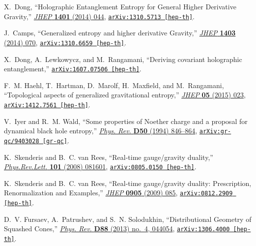 \begin{thebibliography}{100}
X.~Dong, ``{Holographic Entanglement Entropy for General Higher Derivative
  Gravity},'' \href{http://dx.doi.org/10.1007/JHEP01(2014)044}{{\em JHEP} {\bf
  1401} (2014)  044},
\href{http://arxiv.org/abs/1310.5713}{{\tt arXiv:1310.5713 [hep-th]}}.

J.~Camps, ``{Generalized entropy and higher derivative Gravity},''
  \href{http://dx.doi.org/10.1007/JHEP03(2014)070}{{\em JHEP} {\bf 1403} (2014)
   070},
\href{http://arxiv.org/abs/1310.6659}{{\tt arXiv:1310.6659 [hep-th]}}.

X.~Dong, A.~Lewkowycz, and M.~Rangamani, ``{Deriving covariant holographic
  entanglement},''
\href{http://arxiv.org/abs/1607.07506}{{\tt arXiv:1607.07506 [hep-th]}}.

F.~M. Haehl, T.~Hartman, D.~Marolf, H.~Maxfield, and M.~Rangamani,
  ``{Topological aspects of generalized gravitational entropy},''
  \href{http://dx.doi.org/10.1007/JHEP05(2015)023}{{\em JHEP} {\bf 05} (2015)
  023},
\href{http://arxiv.org/abs/1412.7561}{{\tt arXiv:1412.7561 [hep-th]}}.

V.~Iyer and R.~M. Wald, ``{Some properties of Noether charge and a proposal for
  dynamical black hole entropy},''
  \href{http://dx.doi.org/10.1103/PhysRevD.50.846}{{\em Phys. Rev.} {\bf D50}
  (1994)  846--864},
\href{http://arxiv.org/abs/gr-qc/9403028}{{\tt arXiv:gr-qc/9403028 [gr-qc]}}.

K.~Skenderis and B.~C. van Rees, ``{Real-time gauge/gravity duality},''
  \href{http://dx.doi.org/10.1103/PhysRevLett.101.081601}{{\em Phys.Rev.Lett.}
  {\bf 101} (2008)  081601},
\href{http://arxiv.org/abs/0805.0150}{{\tt arXiv:0805.0150 [hep-th]}}.

K.~Skenderis and B.~C. van Rees, ``{Real-time gauge/gravity duality:
  Prescription, Renormalization and Examples},''
  \href{http://dx.doi.org/10.1088/1126-6708/2009/05/085}{{\em JHEP} {\bf 0905}
  (2009)  085},
\href{http://arxiv.org/abs/0812.2909}{{\tt arXiv:0812.2909 [hep-th]}}.

D.~V. Fursaev, A.~Patrushev, and S.~N. Solodukhin, ``{Distributional Geometry
  of Squashed Cones},''
  \href{http://dx.doi.org/10.1103/PhysRevD.88.044054}{{\em Phys. Rev.} {\bf
  D88} (2013) no.~4, 044054},
\href{http://arxiv.org/abs/1306.4000}{{\tt arXiv:1306.4000 [hep-th]}}.


\end{thebibliography}

